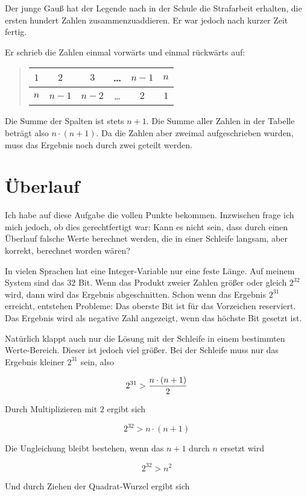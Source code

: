 \documentclass[a5paper,landscape,ngerman,10pt]{article}
\begin{document}
Der junge Gauß hat der Legende nach in der Schule die
Strafarbeit erhalten, die ersten hundert Zahlen
zusammenzuaddieren.
Er war jedoch nach kurzer Zeit fertig.

Er schrieb die Zahlen einmal vorwärts und einmal rückwärts auf:

\begin{quotation}
\begin{tabular}{c|c|c|c|c|c}
$1$&$2$&$3$&\ldots&$n-1$&$n$\\
\hline
$n$&$n-1$&$n-2$&\ldots&$2$&$1$
\end{tabular}
\end{quotation}

Die Summe der Spalten ist stets $n+1$.
Die Summe aller Zahlen in der Tabelle beträgt also $n\cdot(n+1)$.
Da die Zahlen aber zweimal aufgeschrieben wurden, muss das
Ergebnis noch durch zwei geteilt werden.

\section{Überlauf}

Ich habe auf diese Aufgabe die vollen Punkte bekommen.
Inzwischen frage ich mich jedoch, ob dies gerechtfertigt war:
Kann es nicht sein, dass durch einen Überlauf falsche Werte
berechnet werden, die in einer Schleife langsam, aber korrekt,
berechnet worden wären?

In vielen Sprachen hat eine Integer-Variable nur eine feste
Länge.
Auf meinem System sind das $32$ Bit.
Wenn das Produkt zweier Zahlen größer oder gleich $2^{32}$
wird, dann wird das Ergebnis abgeschnitten.
Schon wenn das Ergebnis $2^{31}$ erreicht, entstehen Probleme:
Das oberste Bit ist für das Vorzeichen reserviert.
Das Ergebnis wird als negative Zahl angezeigt, wenn das
höchste Bit gesetzt ist.

Natürlich klappt auch nur die Lösung mit der Schleife in einem
bestimmten Werte-Bereich.
Dieser ist jedoch viel größer.
Bei der Schleife muss nur das Ergebnis kleiner $2^{31}$ sein,
also

\[2^{31} > {n\cdot(n + 1)\over2}\]

Durch Multiplizieren mit $2$ ergibt sich

\[2^{32} > n\cdot(n+1)\]

Die Ungleichung bleibt bestehen, wenn das $n+1$ durch $n$
ersetzt wird

\[2^{32} > n^2\]

Und durch Ziehen der Quadrat-Wurzel ergibt sich
\end{document}

